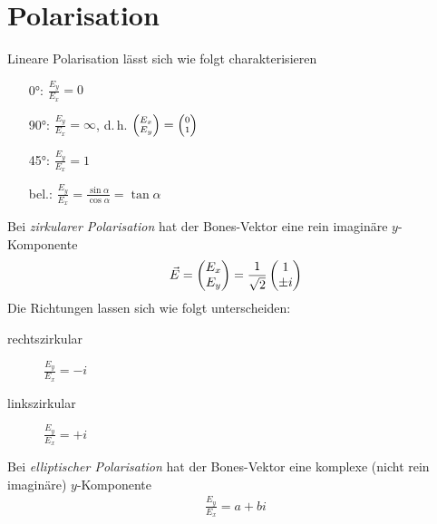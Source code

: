 \chapter{Polarisation}


Lineare Polarisation lässt sich wie folgt charakterisieren
\begin{itemize}
\item[\ang{0}:] $\frac{E_y}{E_x} = 0$
\item[\ang{90}:] $\frac{E_y}{E_x} = \infty$, d.\,h.
$\scriptsize\begin{pmatrix}E_x\\E_y\end{pmatrix}
= \begin{pmatrix}0\\1\end{pmatrix}$
\item[\ang{45}:] $\frac{E_y}{E_x} = 1$
\item[bel.:] 
  $\frac{E_y}{E_x} = \frac{\sin\alpha}{\cos\alpha} = \tan\alpha$
\end{itemize}

Bei \emph{zirkularer Polarisation}
hat der Bones-Vektor eine rein imaginäre
$y$-Komponente
\begin{gather*}
  \vec{E} = \begin{pmatrix}E_x\\E_y\end{pmatrix} 
  = \frac{1}{\sqrt{2}}\begin{pmatrix}1\\\pm i\end{pmatrix}
\end{gather*}
Die Richtungen lassen sich wie folgt unterscheiden:
\begin{description}
\item[rechtszirkular] $\frac{E_y}{E_x}=-i$
\item[linkszirkular] $\frac{E_y}{E_x}=+i$
\end{description}

Bei \emph{elliptischer Polarisation}
hat der Bones-Vektor eine komplexe (nicht rein imaginäre)
$y$-Komponente
\begin{gather*}
  \frac{E_y}{E_x} = a+bi
\end{gather*}


